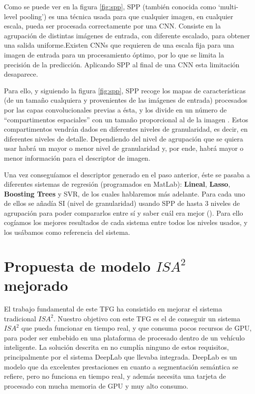 Como se puede ver en la figura \ref{fig:spp}, \ac{SPP} (también conocida como `multi-level pooling') es una técnica usada para que cualquier imagen, en cualquier escala, pueda ser procesada correctamente por una \ac{CNN}. Consiste en la agrupación de distintas imágenes de entrada, con diferente escalado, para obtener una salida uniforme.Existen \ac{CNN}s que requieren de una escala fija para una imagen de entrada para un procesamiento óptimo, por lo que se limita la precisión de la predicción. Aplicando \ac{SPP} al final de una \ac{CNN} esta limitación desaparece.


Para ello, y siguiendo la figura \ref{fig:spp}, \ac{SPP} recoge los mapas de características (de un tamaño cualquiera y provenientes de las imágenes de entrada) procesados por las capas convolucionales previas a ésta, y los divide en un número de ``compartimentos espaciales'' con un tamaño proporcional al de la imagen \cite{spp2}. Estos compartimentos vendrán dados en diferentes niveles de granularidad, es decir, en diferentes niveles de detalle. Dependiendo del nivel de agrupación que se quiera usar habrá un mayor o menor nivel de granularidad y, por ende, habrá mayor o menor información para el descriptor de imagen.


Una vez conseguíamos el descriptor generado en el paso anterior, éste se pasaba a diferentes sistemas de regresión (programados en MatLab): \textbf{Lineal}, \textbf{Lasso}, \textbf{Boosting Trees} y \ac{SVR}, de los cuales hablaremos más adelante. Para cada uno de ellos se añadía \ac{SI} (nivel de granularidad) usando \ac{SPP} de hasta 3 niveles de agrupación para poder compararlos entre sí y saber cuál era mejor (\cite{isa2}). Para ello cogíamos los mejores resultados de cada sistema entre todos los niveles usados, y los usábamos como referencia del sistema.


\section{Propuesta de modelo $ISA^{2}$ mejorado}
\label{sec:isa2_modelo_nuevo}
El trabajo fundamental de este TFG ha consistido en mejorar el sistema tradicional $ISA^{2}$. Nuestro objetivo con este TFG es el de conseguir un sistema $ISA^{2}$ que pueda funcionar en tiempo real, y que consuma pocos recursos de GPU, para poder ser embebido en una plataforma de procesado dentro de un vehículo inteligente. La solución descrita en \cite{isa2} no cumplía ninguno de estos requisitos, principalmente por el sistema DeepLab que llevaba integrada. DeepLab es un modelo que da excelentes prestaciones en cuanto a segmentación semántica se refiere, pero no funciona en tiempo real, y además necesita una tarjeta de procesado con mucha memoria de GPU y muy alto consumo.

